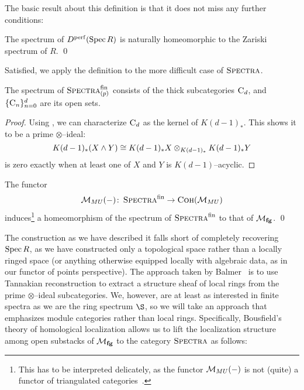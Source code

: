 The basic result about this definition is that it does not miss any further conditions:

\begin{theorem}
The spectrum of \(D^{\mathrm{perf}}(\operatorname{Spec} R)\) is naturally homeomorphic to the Zariski spectrum of \(R\). \qed
\end{theorem}

\noindent Satisfied, we apply the definition to the more difficult case of \(\normalfont\textsc{Spectra}\).

\begin{theorem}
The spectrum of \(\normalfont\textsc{Spectra}_{(p)}^{\mathrm{fin}}\) consists of the thick subcategories \(\normalfont\textsc{C}_d\), and \(\{\normalfont\textsc{C}_n\}_{n=0}^d\) are its open sets.
\end{theorem}
\begin{proof}
Using , we can characterize \(\normalfont\textsc{C}_d\) as the kernel of \(K(d-1)_*\).  This shows it to be a prime \(\otimes\)--ideal: \[K(d-1)_*(X \wedge Y) \cong K(d-1)_* X \otimes_{K(d-1)_*} K(d-1)_* Y\] is zero exactly when at least one of \(X\) and \(Y\) is \(K(d-1)\)--acyclic.
\end{proof}

\begin{corollary}\label{MUInducesSpectrumHomeo}
The functor \[\mathcal{M}_{MU}(-)\colon\thinspace \normalfont\textsc{Spectra}^{\mathrm{fin}} \to \normalfont\textsc{Coh}(\mathcal{M}_{MU})\] induces\footnote{This has to be interpreted delicately, as the functor \(\mathcal{M}_{MU}(-)\) is not (quite) a functor of triangulated categories~\cite[2.4.2]{MoravaCplxBordismInAT}.} a homeomorphism of the spectrum of \(\normalfont\textsc{Spectra}^{\mathrm{fin}}\) to that of \(\mathcal{M}_{\mathbf{fg}}\). \qed
\end{corollary}

The construction as we have described it falls short of completely recovering \(\operatorname{Spec} R\), as we have constructed only a topological space rather than a locally ringed space (or anything otherwise equipped locally with algebraic data, as in our functor of points perspective).  The approach taken by Balmer~\cite[Section 6]{Balmer} is to use Tannakian reconstruction to extract a structure sheaf of local rings from the prime \(\otimes\)--ideal subcategories.  We, however, are at least as interested in finite spectra as we are the ring spectrum \(\S\), so we will take an approach that emphasizes module categories rather than local rings.  Specifically, Bousfield's theory of homological localization allows us to lift the localization structure among open substacks of \(\mathcal{M}_{\mathbf{fg}}\) to the category \(\normalfont\textsc{Spectra}\) as follows:

